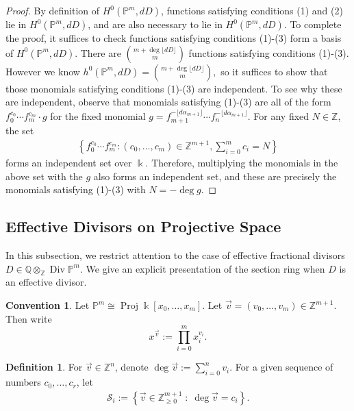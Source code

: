 \documentclass{amsart}
\theoremstyle{plain}
\theoremstyle{definition}
\newtheorem{defn}[thm]{Definition}
\newtheorem{convention}[thm]{Convention}
\theoremstyle{remark}
\numberwithin{equation}{subsection}
\newcommand\ssec{\subsection}
\newcommand\bq{{\mathbb Q}}
\newcommand\bp{{\mathbb P}}
\newcommand\bz{{\mathbb Z}}
\newcommand\bk{{\Bbbk}}
\DeclareMathOperator\di{Div}
\newcommand\mss{\mathscr{S}}
\DeclareMathOperator{\proj}{Proj}
\begin{document}
\begin{proof}
By definition of $H^0(\bp^m,dD)$, functions satisfying conditions 
(1) and (2) lie in $H^0(\mathbb{P}^m,dD)$, and are also necessary to lie in
$H^0(\mathbb{P}^m,dD)$.
To complete the proof, it
suffices to check functions satisfying conditions (1)-(3) form
a basis of $H^0(\bp^m,dD)$. There are $\binom{m+ \deg \lfloor dD \rfloor }{m}$
functions satisfying conditions (1)-(3). However we know
$h^0(\bp^m,dD) = \binom{m+ \deg \lfloor dD \rfloor }{m},$ so it suffices to show
that those monomials satisfying conditions (1)-(3) are
independent. 
To see why these are independent, observe that monomials satisfying (1)-(3) are all of the form
$f_0^{c_0} \cdots f_m^{c_m} \cdot g$ for the fixed monomial
$g = f_{m+1}^{-\lfloor d\alpha_{m+1} \rfloor} \cdots f_n^{-\lfloor d\alpha_{m+1} \rfloor}$.
For any fixed $N \in \bz$, the set 
\begin{align*}
 \left\{ f_0^{c_0} \cdots f_m^{c_m} : (c_0, \ldots, c_m) \in \bz^{m+1}, \sum_{i=0}^m c_i = N \right\}	
\end{align*}
forms an independent set over $\bk$.
Therefore, multiplying the monomials in the above set with the $g$ also forms an independent set, and these are precisely the monomials satisfying (1)-(3) 
with $N = -\deg g$.
\end{proof}


\ssec{Effective Divisors on Projective Space}
\label{ssec:proj-one-point}

In this subsection, we restrict attention to the case of effective
fractional divisors $D \in \bq \otimes_\bz \di \bp^m$. We give an explicit presentation of the section ring when $D$ is an effective
divisor.

\begin{convention}
Let $\bp^m \cong \proj \bk[x_0, \ldots, x_m]$. Let
$\vec{v} = (v_0, \ldots, v_m) \in \bz^{m + 1}$.  Then write
\[
	x^{\vec{v}} := \prod_{i = 0}^{m} x_i^{v_i}.
\]
\end{convention}

\begin{defn}
\label{defn:vec-sum}
For $\vec{v} \in \bz^n$, denote $\deg \vec{v} := \sum_{i = 0}
^n v_i$.
For a given sequence of numbers $c_0, \ldots, c_r$, let 
\begin{align*}
	\mss_i := \left \{\vec{v} \in \bz_{\geq 0}^{m + 1} \; : \;
\deg \vec v = c_i \right\}.	
\end{align*}

\noindent
\end{defn}
\end{document}
